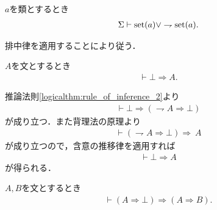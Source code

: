 	\begin{screen}
		\begin{thm}[類は集合であるか真類であるかのいずれかに定まる]
			$a$を類とするとき
			\begin{align}
				\Sigma \vdash \operatorname*{set} (a) \vee \rightharpoondown \operatorname*{set} (a).
			\end{align}
		\end{thm}
	\end{screen}
	
	\begin{prf}
		排中律を適用することにより従う．
		\QED
	\end{prf}
	
	\begin{screen}
		\begin{logicalthm}[矛盾からはあらゆる式が導かれる]\label{logicalthm:contradiction_derives_any_formula}
			$A$を文とするとき
			\begin{align}
				\vdash \bot \Longrightarrow A.
			\end{align}
		\end{logicalthm}
	\end{screen}
	
	\begin{prf}
		推論法則\ref{logicalthm:rule_of_inference_2}より
		\begin{align}
			\vdash \bot \Longrightarrow (\rightharpoondown A \Longrightarrow \bot)
		\end{align}
		が成り立つ．また背理法の原理より
		\begin{align}
			\vdash (\rightharpoondown A \Longrightarrow \bot) \Longrightarrow\ A
		\end{align}
		が成り立つので，含意の推移律を適用すれば
		\begin{align}
			\vdash \bot \Longrightarrow A
		\end{align}
		が得られる．
		\QED
	\end{prf}
	
	\begin{screen}
		\begin{logicalthm}[矛盾を導く式はあらゆる式を導く]\label{logicalthm:formula_leading_to_contradiction_derives_any_formula}
			$A,B$を文とするとき
			\begin{align}
				\vdash (A \Longrightarrow \bot) \Longrightarrow (A \Longrightarrow B).
			\end{align}
		\end{logicalthm}
	\end{screen}
	
